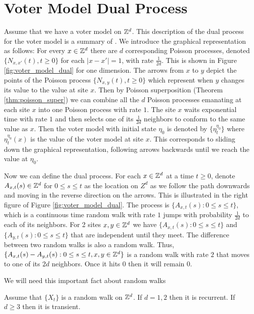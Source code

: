 \section{Voter Model Dual Process}

Assume that we have a voter model on $\mathbb{Z}^d$.
This description of the dual process for the voter model is a summary of \cite{Liggett1999}.
We introduce the graphical representation as follows: For every $x \in \mathbb{Z}^d$ there are $d$ corresponding Poisson processes, denoted $\{N_{x,x'}(t), t \geq 0\}$ for each $|x - x'| = 1$, with rate $\frac{1}{2d}$.
This is shown in Figure \ref{fig:voter_model_dual} for one dimension.
The arrows from $x$ to $y$ depict the points of the Poisson process $\{N_{x,y}(t), t \geq 0\}$ which represent when $y$ changes its value to the value at site $x$.
Then by Poisson superposition (Theorem \ref{thm:poisson_super}) we can combine all the $d$ Poisson processes emanating at each site $x$ into one Poisson process with rate $1$.
The site $x$ waits exponential time with rate $1$ and then selects one of its $\frac{1}{2d}$ neighbors to conform to the same value as $x$.
Then the voter model with initial state $\eta_0$ is denoted by $\{\eta_t^{\eta_0}\}$ where $\eta_t^{\eta_0}(x)$ is the value of the voter model at site $x$.
This corresponds to sliding down the graphical representation, following arrows backwards until we reach the value at $\eta_0$.

Now we can define the dual process.
For each $x \in \mathbb{Z}^d$ at a time $t \geq 0$,
denote $A_{x,t}(s) \in \mathbb{Z}^d$ for $0 \leq s \leq t$ as the location on $Z^d$ as we follow the path downwards and moving in the reverse direction on the arrows. This is illustrated in the right figure of Figure \ref{fig:voter_model_dual}.
The process is $\{A_{x,t}(s) : 0 \leq s \leq t\}$, which is a continuous time random walk with rate $1$ jumps with probability $\frac{1}{2d}$ to each of its neighbors.
For 2 sites $x, y \in \mathbb{Z}^d$ we have
$\{A_{x,t}(s) : 0 \leq s \leq t\}$ and $\{A_{y,t}(s) : 0 \leq s \leq t\}$ that are independent until they meet.
The difference between two random walks is also a random walk.
Thus, $\{A_{x,t}(s) - A_{y,t}(s) : 0 \leq s \leq t, x,y \in \mathbb{Z}^d\}$ is a random walk with rate $2$ that moves to one of its $2d$ neighbors.
Once it hits 0 then it will remain 0.

We will need this important fact about random walks

\begin{theorem} \label{thm:rw_recurrent}
Assume that $\{X_t\}$ is a random walk on $\mathbb{Z}^d$.
If $d = 1,2$ then it is recurrent.
If $d \geq 3$ then it is transient.
\end{theorem}

